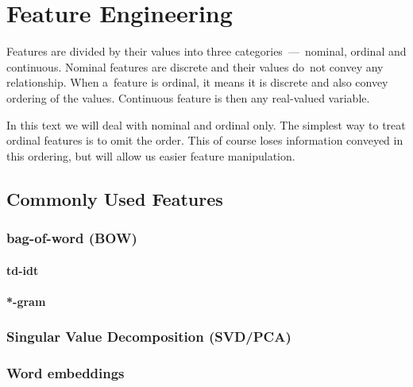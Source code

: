 \chapter{Feature Engineering}




Features are divided by their values into three categories~---~nominal, ordinal and continuous. Nominal features are discrete and their values do~not convey any relationship. When a~feature is ordinal, it means it is discrete and also convey ordering of the values. Continuous feature is then any real-valued variable.

In this text we will deal with nominal and ordinal only. The simplest way to treat ordinal features is to omit the order. This of course loses information conveyed in this ordering, but will allow us easier feature manipulation.

\section{Commonly Used Features}

\subsection{bag-of-word (BOW)}

\subsubsection{td-idt}


\subsubsection{*-gram}




\subsection{Singular Value Decomposition (SVD/PCA)}

\subsection{Word embeddings}

